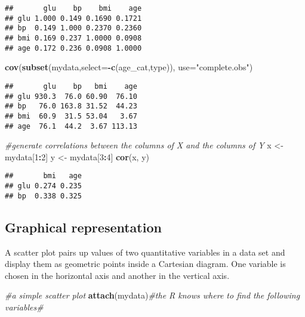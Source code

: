 \documentclass[]{book}
\newenvironment{Shaded}{\begin{snugshade}}{\end{snugshade}}
\newcommand{\KeywordTok}[1]{\textcolor[rgb]{0.13,0.29,0.53}{\textbf{#1}}}
\newcommand{\DataTypeTok}[1]{\textcolor[rgb]{0.13,0.29,0.53}{#1}}
\newcommand{\DecValTok}[1]{\textcolor[rgb]{0.00,0.00,0.81}{#1}}
\newcommand{\StringTok}[1]{\textcolor[rgb]{0.31,0.60,0.02}{#1}}
\newcommand{\CommentTok}[1]{\textcolor[rgb]{0.56,0.35,0.01}{\textit{#1}}}
\newcommand{\OperatorTok}[1]{\textcolor[rgb]{0.81,0.36,0.00}{\textbf{#1}}}
\newcommand{\NormalTok}[1]{#1}
\theoremstyle{definition}
\theoremstyle{definition}
\theoremstyle{definition}
\theoremstyle{remark}
\begin{document}
\begin{verbatim}
##       glu    bp    bmi    age
## glu 1.000 0.149 0.1690 0.1721
## bp  0.149 1.000 0.2370 0.2360
## bmi 0.169 0.237 1.0000 0.0908
## age 0.172 0.236 0.0908 1.0000
\end{verbatim}

\begin{Shaded}
\begin{Highlighting}[]
\KeywordTok{cov}\NormalTok{(}\KeywordTok{subset}\NormalTok{(mydata,}\DataTypeTok{select=}\OperatorTok{-}\KeywordTok{c}\NormalTok{(age_cat,type)), }\DataTypeTok{use=}\StringTok{"complete.obs"}\NormalTok{)}
\end{Highlighting}
\end{Shaded}

\begin{verbatim}
##       glu    bp   bmi    age
## glu 930.3  76.0 60.90  76.10
## bp   76.0 163.8 31.52  44.23
## bmi  60.9  31.5 53.04   3.67
## age  76.1  44.2  3.67 113.13
\end{verbatim}

\begin{Shaded}
\begin{Highlighting}[]
\CommentTok{#generate correlations between the columns of X and the columns of Y}
\NormalTok{x <-}\StringTok{ }\NormalTok{mydata[}\DecValTok{1}\OperatorTok{:}\DecValTok{2}\NormalTok{]}
\NormalTok{y <-}\StringTok{ }\NormalTok{mydata[}\DecValTok{3}\OperatorTok{:}\DecValTok{4}\NormalTok{]}
\KeywordTok{cor}\NormalTok{(x, y)}
\end{Highlighting}
\end{Shaded}

\begin{verbatim}
##       bmi   age
## glu 0.274 0.235
## bp  0.338 0.325
\end{verbatim}

\subsection{Graphical representation}\label{graphical-representation-2}

A scatter plot pairs up values of two quantitative variables in a data
set and display them as geometric points inside a Cartesian diagram. One
variable is chosen in the horizontal axis and another in the vertical
axis.

\begin{Shaded}
\begin{Highlighting}[]
\CommentTok{#a simple scatter plot}
\KeywordTok{attach}\NormalTok{(mydata)}\CommentTok{#the R knows where to find the following variables#}
\end{Highlighting}
\end{Shaded}
\end{document}
